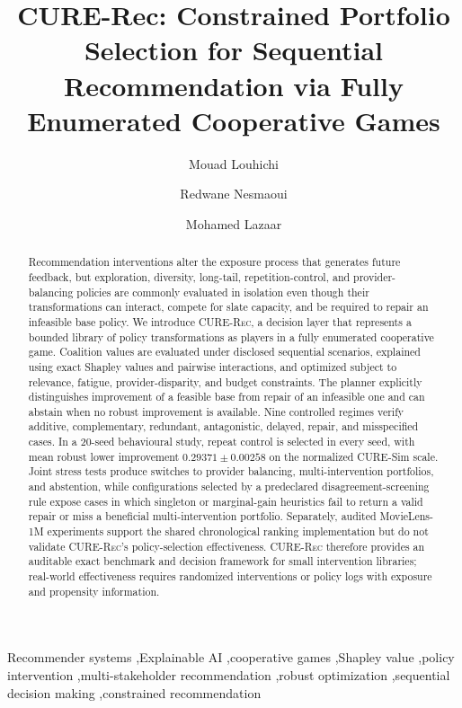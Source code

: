\documentclass[review]{elsarticle}
\theoremstyle{plain}
\theoremstyle{definition}
\theoremstyle{remark}
\newcommand{\CURE}{\textsc{CURE-Rec}}
\begin{document}
\begin{frontmatter}

\title{CURE-Rec: Constrained Portfolio Selection for Sequential Recommendation via Fully Enumerated Cooperative Games}

\author[1]{Mouad Louhichi}
\author[1]{Redwane Nesmaoui}
\author[1]{Mohamed Lazaar}

\begin{abstract}
Recommendation interventions alter the exposure process that generates future feedback, but exploration, diversity, long-tail, repetition-control, and provider-balancing policies are commonly evaluated in isolation even though their transformations can interact, compete for slate capacity, and be required to repair an infeasible base policy. We introduce \CURE{}, a decision layer that represents a bounded library of policy transformations as players in a fully enumerated cooperative game. Coalition values are evaluated under disclosed sequential scenarios, explained using exact Shapley values and pairwise interactions, and optimized subject to relevance, fatigue, provider-disparity, and budget constraints. The planner explicitly distinguishes improvement of a feasible base from repair of an infeasible one and can abstain when no robust improvement is available. Nine controlled regimes verify additive, complementary, redundant, antagonistic, delayed, repair, and misspecified cases. In a 20-seed behavioural study, repeat control is selected in every seed, with mean robust lower improvement $0.29371\pm0.00258$ on the normalized CURE-Sim scale. Joint stress tests produce switches to provider balancing, multi-intervention portfolios, and abstention, while configurations selected by a predeclared disagreement-screening rule expose cases in which singleton or marginal-gain heuristics fail to return a valid repair or miss a beneficial multi-intervention portfolio. Separately, audited MovieLens-1M experiments support the shared chronological ranking implementation but do not validate \CURE{}'s policy-selection effectiveness. \CURE{} therefore provides an auditable exact benchmark and decision framework for small intervention libraries; real-world effectiveness requires randomized interventions or policy logs with exposure and propensity information.
\end{abstract}

\begin{keyword}
Recommender systems \sep Explainable AI \sep cooperative games \sep Shapley value \sep policy intervention \sep multi-stakeholder recommendation \sep robust optimization \sep sequential decision making \sep constrained recommendation
\end{keyword}

\end{frontmatter}
\end{document}
